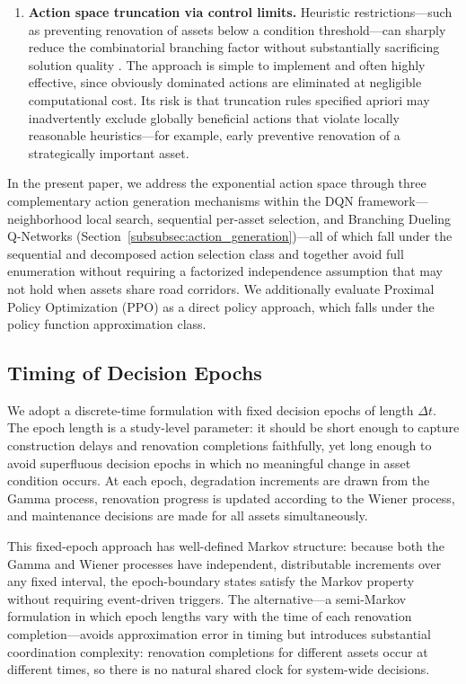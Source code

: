 \documentclass[3p, twocolumn]{elsarticle}
\begin{document}
\begin{enumerate}
    \item \textbf{Action space truncation via control limits.} Heuristic restrictions---such as preventing renovation of assets below a condition threshold---can sharply reduce the combinatorial branching factor without substantially sacrificing solution quality \citep{verleijsdonkMaintenanceOptimizationAsset2025}. The approach is simple to implement and often highly effective, since obviously dominated actions are eliminated at negligible computational cost. Its risk is that truncation rules specified apriori may inadvertently exclude globally beneficial actions that violate locally reasonable heuristics---for example, early preventive renovation of a strategically important asset.
\end{enumerate}

In the present paper, we address the exponential action space through three complementary action generation mechanisms within the DQN framework---neighborhood local search, sequential per-asset selection, and Branching Dueling Q-Networks (Section~\ref{subsubsec:action_generation})---all of which fall under the sequential and decomposed action selection class and together avoid full enumeration without requiring a factorized independence assumption that may not hold when assets share road corridors. We additionally evaluate Proximal Policy Optimization (PPO) as a direct policy approach, which falls under the policy function approximation class.


\subsection{Timing of Decision Epochs}
\label{subsec:epochs}

We adopt a discrete-time formulation with fixed decision epochs of length $\Delta t$. The epoch length is a study-level parameter: it should be short enough to capture construction delays and renovation completions faithfully, yet long enough to avoid superfluous decision epochs in which no meaningful change in asset condition occurs. At each epoch, degradation increments are drawn from the Gamma process, renovation progress is updated according to the Wiener process, and maintenance decisions are made for all assets simultaneously.

This fixed-epoch approach has well-defined Markov structure: because both the Gamma and Wiener processes have independent, distributable increments over any fixed interval, the epoch-boundary states satisfy the Markov property without requiring event-driven triggers. The alternative---a semi-Markov formulation in which epoch lengths vary with the time of each renovation completion---avoids approximation error in timing but introduces substantial coordination complexity: renovation completions for different assets occur at different times, so there is no natural shared clock for system-wide decisions.
\end{document}
